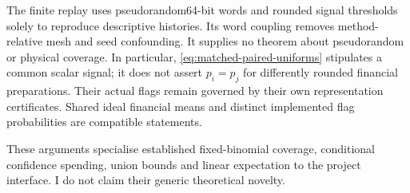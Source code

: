 The finite replay uses pseudorandom64-bit words and rounded signal
thresholds solely to reproduce descriptive histories. Its word coupling
removes method-relative mesh and seed confounding. It supplies no
theorem about pseudorandom or physical coverage. In particular,
\eqref{eq:matched-paired-uniforms} stipulates a common scalar signal;
it does not assert $p_i=p_j$ for differently rounded financial
preparations. Their actual flags remain governed by their own
representation certificates. Shared ideal financial means and distinct
implemented flag probabilities are compatible statements.

These arguments specialise established fixed-binomial coverage,
conditional confidence spending, union bounds and linear expectation to
the project interface. I do not claim their generic theoretical novelty.
